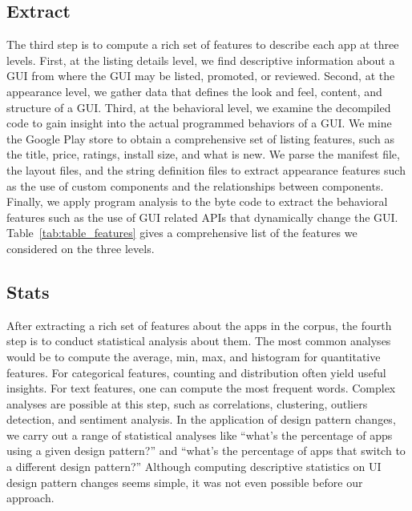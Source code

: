 \subsection{Extract}
The third step is to compute a rich set of features to describe each app at three levels.
First, at the listing details level, we find descriptive information about a GUI from where the GUI may be listed, promoted, or reviewed.
Second, at the appearance level, we gather data that defines the look and feel, content, and structure of a GUI.
Third, at the behavioral level, we examine the decompiled code to gain insight into the actual programmed behaviors of a GUI.
We mine the Google Play store to obtain a comprehensive set of listing features, such as the title, price, ratings, install size, and what is new.
We parse the manifest file, the layout files, and the string definition files to extract appearance features such as the use of custom components and the relationships between components.
Finally, we apply program analysis to the byte code to extract the behavioral features such as the use of GUI related APIs that dynamically change the GUI. 
Table~\ref{tab:table_features} gives a comprehensive list of the features we considered on the three levels.

\subsection{Stats}
After extracting a rich set of features about the apps in the corpus, the fourth step is to conduct statistical analysis about them.
The most common analyses would be to compute the average, min, max, and histogram for quantitative features.
For categorical features, counting and distribution often yield useful insights. For text features, one can compute the most frequent words.
Complex analyses are possible at this step, such as correlations, clustering, outliers detection, and sentiment analysis.
In the application of design pattern changes, we carry out a range of statistical analyses like ``what's the percentage of apps using a given design pattern?'' and ``what's the percentage of apps that switch to a different design pattern?''
Although computing descriptive statistics on UI design pattern changes seems simple, it was not even possible before our approach.


